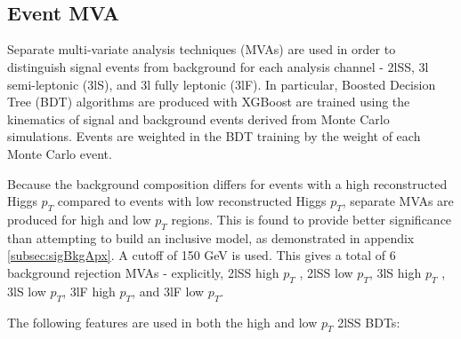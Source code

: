 \begin{figure}[H]
    \\                             
    \\                         
    \caption{}
    \label{fig:presel3l}                                                                                          
\end{figure}


\subsection{Event MVA}
\label{subsec:sigBkgMVA}

Separate multi-variate analysis techniques (MVAs) are used in order to distinguish signal events from background for each analysis channel - 2lSS, 3l semi-leptonic (3lS), and 3l fully leptonic (3lF). In particular, Boosted Decision Tree (BDT) algorithms are produced with XGBoost \cite{xgboost} are trained using the kinematics of signal and background events derived from Monte Carlo simulations. Events are weighted in the BDT training by the weight of each Monte Carlo event. 

Because the background composition differs for events with a high reconstructed Higgs $p_T$ compared to events with low reconstructed Higgs $p_T$, separate MVAs are produced for high and low $p_T$ regions. This is found to provide better significance than attempting to build an inclusive model, as demonstrated in appendix \ref{subsec:sigBkgApx}. A cutoff of 150 GeV is used. This gives a total of 6 background rejection MVAs - explicitly, 2lSS high $p_T$ , 2lSS low $p_T$, 3lS high $p_T$ , 3lS low $p_T$, 3lF high $p_T$, and 3lF low $p_T$.

The following features are used in both the high and low $p_T$ 2lSS BDTs:

